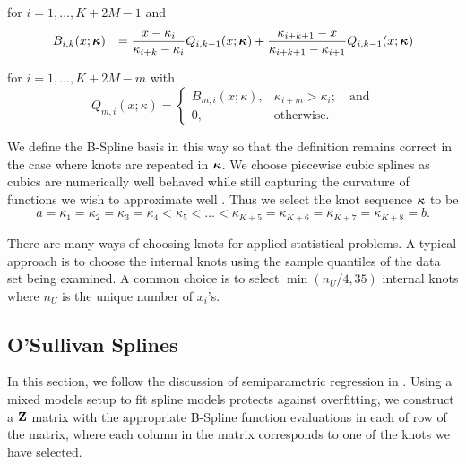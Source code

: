\noindent for $i = 1, \ldots, K + 2M -1$ and
$$
\begin{array}{rl}
	B_{i, k}(x; {\boldsymbol \kappa}) & \displaystyle = \frac{x - \kappa_i}{\kappa_{i + k} - \kappa_i} Q_{i, k-1} (x; {\boldsymbol \kappa}) + 
										\frac{\kappa_{i + k + 1} - x}{\kappa_{i + k + 1} - \kappa_{i + 1}} Q_{i, k-1} (x; {\boldsymbol \kappa})
\end{array}
$$

\noindent for $i = 1, \ldots, K + 2 M - m$ with
$$
Q_{m, i}(x; \kappa) =
\begin{cases}
B_{m, i}(x; \kappa),& \kappa_{i + m} > \kappa_i; \quad \mbox{and} \\
0, & \text{otherwise}.
\end{cases}
$$

We define the B-Spline basis in this way so that the definition remains correct
in the case where knots are repeated in ${\boldsymbol \kappa}$. We choose piecewise cubic
splines as cubics are numerically well behaved while still capturing the
curvature of functions we wish to approximate well
\citep{Press:2007:NRE:1403886}. Thus we select the knot sequence ${\boldsymbol \kappa}$ to be
$$
a = \kappa_1 = \kappa_2 = \kappa_3 = \kappa_4 < \kappa_5 < \ldots < \kappa_{K+5} = \kappa_{K+6} = \kappa_{K+7} = \kappa_{K+8} = b.
$$

There are many ways of choosing knots for applied statistical problems. A
typical approach is to choose the internal knots using the sample quantiles of
the data set being examined.
A common choice is to select 
$\min(n_U/4, 35)$ internal knots
where $n_U$ is the unique number of $x_i$'s.

\subsection{O'Sullivan Splines}

In this section, we follow the discussion of semiparametric regression in
\cite{ruppert_wand_carroll_2003}.  Using a mixed models setup to fit spline
models protects against overfitting, we construct a ${\bf Z}$ matrix with the
appropriate B-Spline function evaluations in each of row of the matrix, where
each column in the matrix corresponds to one of the knots we have selected.

